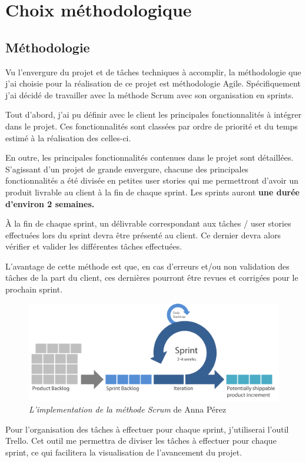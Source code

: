 \section{Choix méthodologique}

\subsection{Méthodologie}

Vu l'envergure du projet et de tâches techniques à accomplir, la méthodologie que j’ai choisie pour la réalisation de ce projet est méthodologie Agile.
Spécifiquement j'ai décidé de travailler avec la méthode Scrum avec son organisation en sprints.

Tout d'abord, j'ai pu définir avec le client les principales fonctionnalités à intégrer dans le projet. Ces fonctionnalités sont classées par ordre de priorité et du temps estimé à la réalisation des celles-ci.

En outre, les principales fonctionnalités contenues dans le projet sont détaillées. S'agissant d'un projet de grande envergure, chacune des principales fonctionnalités a été divisée en petites user stories qui me permettront d'avoir un produit livrable au client à la fin de chaque sprint. Les sprints auront \textbf{une durée d’environ 2 semaines.}

À la fin de chaque sprint, un délivrable correspondant aux tâches / user stories effectuées lors du sprint devra être présenté au client. Ce dernier devra alors vérifier et valider les différentes tâches effectuées.

L'avantage de cette méthode est que, en cas d'erreurs et/ou non validation des tâches de la part du client, ces dernières pourront être revues et corrigées pour le prochain sprint.

\begin{figure}[H]
  \centering
  \includegraphics[width=0.75\linewidth]{img/agile.png}
  \caption{ \textit{L'implementation de la méthode Scrum} de Anna Pérez}
  \label{agile}
\end{figure}
Pour l’organisation des tâches à effectuer pour chaque sprint, j’utiliserai l’outil Trello. Cet outil me permettra de diviser les tâches à effectuer pour chaque sprint, ce qui facilitera la visualisation de l’avancement du projet.

